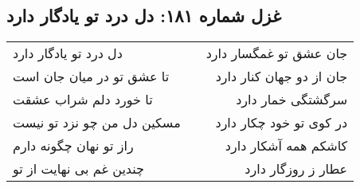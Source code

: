 \begin{center}
\section*{غزل شماره ۱۸۱: دل درد تو یادگار دارد}
\label{sec:181}
\begin{longtable}{l p{0.5cm} r}
دل درد تو یادگار دارد
&&
جان عشق تو غمگسار دارد
\\
تا عشق تو در میان جان است
&&
جان از دو جهان کنار دارد
\\
تا خورد دلم شراب عشقت
&&
سرگشتگی خمار دارد
\\
مسکین دل من چو نزد تو نیست
&&
در کوی تو خود چکار دارد
\\
راز تو نهان چگونه دارم
&&
کاشکم همه آشکار دارد
\\
چندین غم بی نهایت از تو
&&
عطار ز روزگار دارد
\\
\end{longtable}
\end{center}
